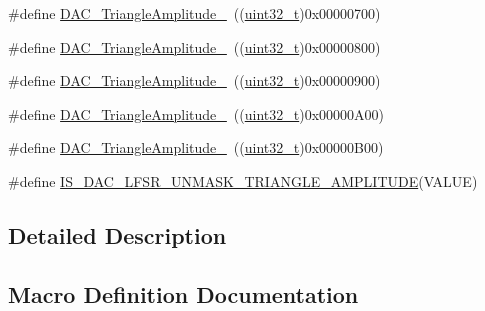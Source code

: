 \begin{DoxyCompactItemize}
\item 
\#define \hyperlink{group___d_a_c__lfsrunmask__triangleamplitude_gadb404422c86a7b92d78e6d9617e8ce4d}{D\+A\+C\+\_\+\+Triangle\+Amplitude\+\_}~((\hyperlink{_p_e___types_8h_a33594304e786b158f3fb30289278f5af}{uint32\+\_\+t})0x00000700)
\item 
\#define \hyperlink{group___d_a_c__lfsrunmask__triangleamplitude_ga565b0c97bbdf152756617d491bf8ef85}{D\+A\+C\+\_\+\+Triangle\+Amplitude\+\_}~((\hyperlink{_p_e___types_8h_a33594304e786b158f3fb30289278f5af}{uint32\+\_\+t})0x00000800)
\item 
\#define \hyperlink{group___d_a_c__lfsrunmask__triangleamplitude_ga7d573b0cebb1b939bd83367effb93d89}{D\+A\+C\+\_\+\+Triangle\+Amplitude\+\_}~((\hyperlink{_p_e___types_8h_a33594304e786b158f3fb30289278f5af}{uint32\+\_\+t})0x00000900)
\item 
\#define \hyperlink{group___d_a_c__lfsrunmask__triangleamplitude_gad33d28d7fcc09d84500ea9b6e6c5feed}{D\+A\+C\+\_\+\+Triangle\+Amplitude\+\_}~((\hyperlink{_p_e___types_8h_a33594304e786b158f3fb30289278f5af}{uint32\+\_\+t})0x00000\+A00)
\item 
\#define \hyperlink{group___d_a_c__lfsrunmask__triangleamplitude_ga3ce69f5a63a2464dc4b5f73cb6fe72f5}{D\+A\+C\+\_\+\+Triangle\+Amplitude\+\_}~((\hyperlink{_p_e___types_8h_a33594304e786b158f3fb30289278f5af}{uint32\+\_\+t})0x00000\+B00)
\item 
\#define \hyperlink{group___d_a_c__lfsrunmask__triangleamplitude_ga20f7c3c43f917f14593f0c478c2412e1}{I\+S\+\_\+\+D\+A\+C\+\_\+\+L\+F\+S\+R\+\_\+\+U\+N\+M\+A\+S\+K\+\_\+\+T\+R\+I\+A\+N\+G\+L\+E\+\_\+\+A\+M\+P\+L\+I\+T\+U\+DE}(V\+A\+L\+UE)
\end{DoxyCompactItemize}


\subsection{Detailed Description}


\subsection{Macro Definition Documentation}
